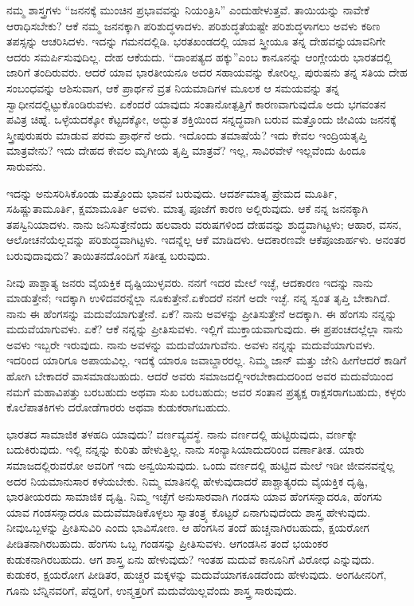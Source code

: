 ನಮ್ಮ ಶಾಸ್ತ್ರಗಳು “ಜನನಕ್ಕೆ ಮುಂಚಿನ ಪ್ರಭಾವವನ್ನು ನಿಯಂತ್ರಿಸಿ” ಎಂದು\break ಹೇಳುತ್ತವೆ. ತಾಯಿಯನ್ನು ನಾವೇಕೆ ಆರಾಧಿಸಬೇಕು? ಆಕೆ ನಮ್ಮ ಜನನಕ್ಕಾಗಿ ಪರಿಶುದ್ಧಳಾದಳು. ಪರಿಶುದ್ಧತೆಯಷ್ಟೇ ಪರಿಶುದ್ಧಳಾಗಲು ಅವಳು ಕಠಿಣ ತಪಸ್ಸನ್ನು ಆಚರಿಸಿದಳು. ಇದನ್ನು ಗಮನದಲ್ಲಿಡಿ. ಭರತಖಂಡದಲ್ಲಿ ಯಾವ ಸ್ತ್ರೀಯೂ ತನ್ನ ದೇಹವನ್ನು\break ಯಾವನಿಗೇ ಆದರು ಸಮರ್ಪಿಸುವುದಿಲ್ಲ. ದೇಹ ಆಕೆಯದು. “ದಾಂಪತ್ಯದ ಹಕ್ಕು”\break ಎಂಬ ಕಾನೂನನ್ನು ಆಂಗ್ಲೇಯರು ಭಾರತದಲ್ಲಿ ಜಾರಿಗೆ ತಂದಿರುವರು. ಆದರೆ ಯಾವ ಭಾರತೀಯನೂ ಅದರ ಸಹಾಯವನ್ನು ಕೋರಿಲ್ಲ. ಪುರುಷನು ತನ್ನ ಸತಿಯ ದೇಹ ಸಂಬಂಧವನ್ನು ಆಶಿಸುವಾಗ, ಆಕೆ ಪ್ರಾರ್ಥನೆ ವ್ರತ ನಿಯಮಾದಿಗಳ ಮೂಲಕ ಆ ಸಮಯವನ್ನು ತನ್ನ ಸ್ವಾಧೀನದಲ್ಲಿಟ್ಟುಕೊಂಡಿರುವಳು. ಏಕೆಂದರೆ ಯಾವುದು ಸಂತಾನೋತ್ಪತ್ತಿಗೆ ಕಾರಣವಾಗುವುದೊ ಅದು ಭಗವಂತನ ಪವಿತ್ರ ಚಿಹ್ನೆ. ಒಳ್ಳೆಯದಕ್ಕೋ ಕೆಟ್ಟದಕ್ಕೋ, ಅದ್ಭುತ ಶಕ್ತಿಯಿಂದ ಸನ್ನದ್ಧವಾಗಿ ಬರುವ ಮತ್ತೊಂದು ಜೀವಿಯ ಜನನಕ್ಕೆ ಸ್ತ್ರೀಪುರುಷರು ಮಾಡುವ ಪರಮ ಪ್ರಾರ್ಥನೆ ಅದು. ಇದೊಂದು ತಮಾಷೆಯೆ? ಇದು ಕೇವಲ ಇಂದ್ರಿಯತೃಪ್ತಿ ಮಾತ್ರವೇನು? ಇದು ದೇಹದ ಕೇವಲ ಮೃಗೀಯ ತೃಪ್ತಿ ಮಾತ್ರವೆ? ಇಲ್ಲ, ಸಾವಿರವೇಳೆ ಇಲ್ಲವೆಂದು ಹಿಂದೂ ಸಾರುವನು.

ಇದನ್ನು ಅನುಸರಿಸಿಕೊಂಡು ಮತ್ತೊಂದು ಭಾವನೆ ಬರುವುದು. ಆದರ್ಶಮಾತೃ ಪ್ರೇಮದ ಮೂರ್ತಿ, ಸಹಿಷ್ಣುತಾಮೂರ್ತಿ, ಕ್ಷಮಾಮೂರ್ತಿ ಅವಳು. ಮಾತೃ ಪೂಜೆಗೆ ಕಾರಣ ಅಲ್ಲಿರುವುದು. ಆಕೆ ನನ್ನ ಜನನಕ್ಕಾಗಿ ತಪಸ್ವಿನಿಯಾದಳು. ನಾನು ಜನಿಸುತ್ತೇನೆಂದು ಹಲವಾರು ವರುಷಗಳಿಂದ ದೇಹವನ್ನು ಶುದ್ಧವಾಗಿಟ್ಟಳು; ಆಹಾರ, ವಸನ, ಆಲೋಚನೆ\-ಯೆಲ್ಲವನ್ನು ಪರಿಶುದ್ಧವಾಗಿಟ್ಟಳು. ಇದನ್ನೆಲ್ಲ ಆಕೆ ಮಾಡಿದಳು. ಆದಕಾರಣವೇ ಆಕೆ\break ಪೂಜಾರ್ಹಳು. ಅನಂತರ ಬರುವುದಾವುದು? ತಾಯಿತನದೊಂದಿಗೆ ಸತೀತ್ವ ಬರುವುದು.

ನೀವು ಪಾಶ್ಚಾತ್ಯ ಜನರು ವೈಯಕ್ತಿಕ ದೃಷ್ಟಿಯುಳ್ಳವರು. ನನಗೆ ಇದರ ಮೇಲೆ ಇಚ್ಛೆ, ಆದಕಾರಣ ಇದನ್ನು ನಾನು ಮಾಡುತ್ತೇನೆ; ಇದಕ್ಕಾಗಿ ಉಳಿದವರನ್ನೆಲ್ಲಾ ನೂಕುತ್ತೇನೆ.\break ಏಕೆಂದರೆ ನನಗೆ ಅದೇ ಇಚ್ಛೆ. ನನ್ನ ಸ್ವಂತ ತೃಪ್ತಿ ಬೇಕಾಗಿದೆ. ನಾನು ಈ ಹೆಂಗಸನ್ನು ಮದುವೆಯಾಗುತ್ತೇನೆ. ಏಕೆ? ನಾನು ಅವಳನ್ನು ಪ್ರೀತಿಸುತ್ತೇನೆ ಅದಕ್ಕಾಗಿ. ಈ ಹೆಂಗಸು ನನ್ನನ್ನು ಮದುವೆಯಾಗುವಳು. ಏಕೆ? ಆಕೆ ನನ್ನನ್ನು ಪ್ರೀತಿಸುವಳು. ಇಲ್ಲಿಗೆ ಮುಕ್ತಾಯವಾಗುವುದು. ಈ ಪ್ರಪಂಚದಲ್ಲೆಲ್ಲಾ ನಾನು ಅವಳು ಇಬ್ಬರೇ ಇರುವುದು. ನಾನು ಅವಳನ್ನು ಮದುವೆಯಾಗುವೆನು. ಅವಳು ನನ್ನನ್ನು ಮದುವೆಯಾಗುವಳು. ಇದರಿಂದ ಯಾರಿಗೂ ಅಪಾಯವಿಲ್ಲ. ಇದಕ್ಕೆ ಯಾರೂ ಜವಾಬ್ದಾರರಲ್ಲ. ನಿಮ್ಮ ಜಾನ್​ ಮತ್ತು ಜೇನಿ ಹೀಗೆ\break ಆದರೆ ಕಾಡಿಗೆ ಹೋಗಿ ಬೇಕಾದರೆ ವಾಸಮಾಡಬಹುದು. ಆದರೆ ಅವರು ಸಮಾಜದಲ್ಲಿ\break ಇರಬೇಕಾದುದರಿಂದ ಅವರ ಮದುವೆಯಿಂದ ನಮಗೆ ಮಹಾವಿಪತ್ತು ಬರಬಹುದು ಅಥವಾ ಸುಖ ಬರಬಹುದು; ಅವರ ಸಂತಾನ ಪ್ರತ್ಯಕ್ಷ ರಾಕ್ಷಸರಾಗಬಹುದು, ಕಳ್ಳರು ಕೊಲೆಪಾತಕಿಗಳು ದರೋಡೆಗಾರರು ಅಥವಾ ಕುಡುಕರಾಗಬಹುದು.

ಭಾರತದ ಸಾಮಾಜಿಕ ತಳಹದಿ ಯಾವುದು? ವರ್ಣವ್ಯವಸ್ಥೆ. ನಾನು ವರ್ಣದಲ್ಲಿ ಹುಟ್ಟಿರುವುದು, ವರ್ಣಕ್ಕೇ ಬದುಕಿರುವುದು. ಇಲ್ಲಿ ನನ್ನನ್ನು ಕುರಿತು ಹೇಳುತ್ತಿಲ್ಲ. ನಾನು ಸಂನ್ಯಾಸಿಯಾದುದರಿಂದ ವರ್ಣಾತೀತ. ಯಾರು ಸಮಾಜದಲ್ಲಿರುವರೋ ಅವರಿಗೆ ಇದು ಅನ್ವಯಿಸುವುದು. ಒಂದು ವರ್ಣದಲ್ಲಿ ಹುಟ್ಟಿದ ಮೇಲೆ ಇಡೀ ಜೀವನವನ್ನೆಲ್ಲ ಅದರ ನಿಯಮಾನುಸಾರ ಕಳೆಯಬೇಕು. ನಿಮ್ಮ ಮಾತಿನಲ್ಲಿ ಹೇಳುವುದಾದರೆ ಪಾಶ್ಚಾತ್ಯರದು ವೈಯಕ್ತಿಕ ದೃಷ್ಟಿ, ಭಾರತೀಯರದು ಸಾಮಾಜಿಕ ದೃಷ್ಟಿ. ನಿಮ್ಮ ಇಚ್ಛೆಗೆ ಅನುಸಾರವಾಗಿ ಗಂಡಸು ಯಾವ ಹೆಂಗಸನ್ನಾದರೂ, ಹೆಂಗಸು ಯಾವ ಗಂಡಸನ್ನಾದರೂ ಮದುವೆ\break ಮಾಡಿಕೊಳ್ಳಲು ಸ್ವಾತಂತ್ರ್ಯ ಕೊಟ್ಟರೆ ಏನಾಗುವುದೆಂದು ಶಾಸ್ತ್ರ ಹೇಳುವುದು. ನೀವು\break ಒಬ್ಬಳನ್ನು ಪ್ರೀತಿಸುವಿರಿ ಎಂದು ಭಾವಿಸೋಣ. ಆ ಹೆಂಗಸಿನ ತಂದೆ ಹುಚ್ಚನಾಗಿರಬಹುದು, ಕ್ಷಯರೋಗ ಪೀಡಿತನಾಗಿರಬಹುದು. ಹೆಂಗಸು ಒಬ್ಬ ಗಂಡಸನ್ನು ಪ್ರೀತಿಸುವಳು. ಆ\break ಗಂಡಸಿನ ತಂದೆ ಭಯಂಕರ ಕುಡುಕನಾಗಿರಬಹುದು. ಆಗ ಶಾಸ್ತ್ರ ಏನು ಹೇಳುವುದು? ಇಂತಹ ಮದುವೆ ಕಾನೂನಿಗೆ ವಿರೋಧ ಎನ್ನುವುದು. ಕುಡುಕರ, ಕ್ಷಯರೋಗ ಪೀಡಿತರ, ಹುಚ್ಚರ ಮಕ್ಕಳನ್ನು ಮದುವೆಯಾಗಕೂಡದೆಂದು ಹೇಳುವುದು. ಅಂಗಹೀನರಿಗೆ, ಗೂನು ಬೆನ್ನಿನವರಿಗೆ, ಪೆದ್ದರಿಗೆ, ಉನ್ಮತ್ತರಿಗೆ ಮದುವೆಯಿಲ್ಲವೆಂದು ಶಾಸ್ತ್ರ ಸಾರುವುದು.

